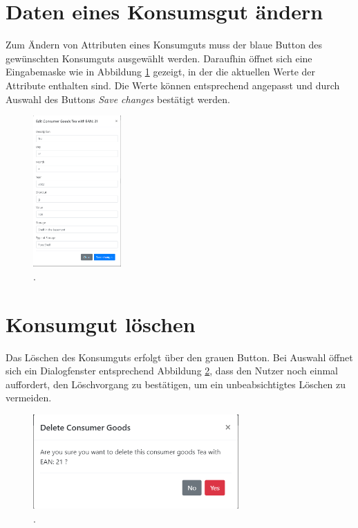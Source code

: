 \section{Daten eines Konsumsgut ändern}
\label{konsumgut-aendern}
Zum Ändern von Attributen eines Konsumguts muss der blaue Button des gewünschten Konsumguts ausgewählt werden.
Daraufhin öffnet sich eine Eingabemaske wie in Abbildung \ref{fig:gui-edit} gezeigt, in der die aktuellen Werte der Attribute enthalten sind.
Die Werte können entsprechend angepasst und durch Auswahl des Buttons \textit{Save changes} bestätigt werden.
\begin{figure}[H]
	\centering
	\includegraphics[width=0.3\textwidth]{Bilder/gui/gui-edit-consumer-goods.PNG}
	\caption[.]{.}
	\label{fig:gui-edit}
\end{figure}

\section{Konsumgut löschen}
\label{konsumgut-loeschen}
Das Löschen des Konsumguts erfolgt über den grauen Button.
Bei Auswahl öffnet sich ein Dialogfenster entsprechend Abbildung \ref{fig:gui-delete-item}, dass den Nutzer noch einmal auffordert, den Löschvorgang zu bestätigen, um ein unbeabsichtigtes Löschen zu vermeiden.

\begin{figure}[H]
	\centering
	\includegraphics[width=0.7\textwidth]{Bilder/gui/gui-delete-consumer-goods.PNG}
	\caption[.]{.}
	\label{fig:gui-delete-item}
\end{figure}

